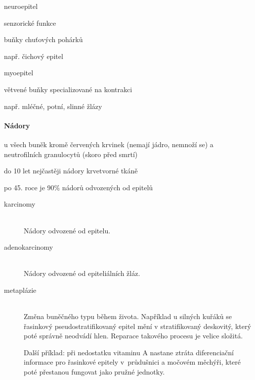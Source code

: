 \documentclass[DIV=8]{scrreprt}
\begin{document}
\begin{myItemize}[nosep]
\begin{myItemize}[nosep]
    \item neuroepitel
\begin{myItemize}[nosep]
    \item senzorické funkce
    \item buňky chuťových pohárků
    \item např. čichový epitel
\end{myItemize}

    \item myoepitel
\begin{myItemize}[nosep]
    \item větvené buňky specializované na kontrakci
    \item např. mléčné, potní, slinné žlázy
\end{myItemize}

\end{myItemize}

\end{myItemize}



\paragraph{Nádory}
\begin{myItemize}[nosep]
    \item u všech buněk kromě červených krvinek (nemají jádro, nemnoží se) a neutrofilních granulocytů (skoro před smrtí)
    \item do 10 let nejčastěji nádory krvetvorné tkáně
    \item po 45. roce je 90\% nádorů odvozených od epitelů
\end{myItemize}



\begin{description}
\item[karcinomy]\hfill \\
Nádory odvozené od epitelu.


\item[adenokarcinomy]\hfill \\
Nádory odvozené od epiteliálních žláz.


\item[metaplázie]\hfill \\
Změna buněčného typu během života. Například u silných kuřáků se řasinkový pseudostratifikovaný epitel mění v stratifikovaný deskovitý, který poté správně neodvádí hlen. Reparace takového procesu je velice složitá.

Další příklad: při nedostatku vitaminu A nastane ztráta diferenciační informace pro řasinkové epitely v průdušnici a močovém měchýři, které poté přestanou fungovat jako pružné jednotky.

\end{description}
\end{document}
